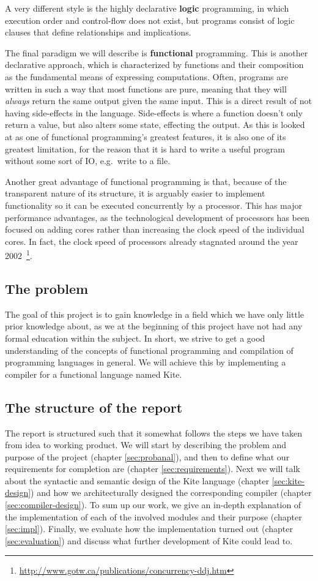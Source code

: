 A very different style is the highly declarative \textbf{logic} programming, in which execution order and control-flow does not exist, but programs consist of logic clauses that define relationships and implications.

The final paradigm we will describe is \textbf{functional} programming. This is another declarative approach, which is characterized by functions and their composition as the fundamental means of expressing computations. Often, programs are written in such a way that most functions are pure, meaning that they will \emph{always} return the same output given the same input. This is a direct result of not having side-effects in the language. Side-effects is where a function doesn't only return a value, but also alters some state, effecting the output. As this is looked at as one of functional programming's greatest features, it is also one of its greatest limitation, for the reason that it is hard to write a useful program without some sort of IO, e.g.\ write to a file.

Another great advantage of functional programming is that, because of the transparent nature of its structure, it is arguably easier to implement functionality so it can be executed concurrently by a processor. This has major performance advantages, as the technological development of processors has been focused on adding cores rather than increasing the clock speed of the individual cores. In fact, the clock speed of processors already stagnated around the year 2002~\footnote{\url{http://www.gotw.ca/publications/concurrency-ddj.htm}}.


\subsection{The problem}
The goal of this project is to gain knowledge in a field which we have only little prior knowledge about, as we at the beginning of this project have not had any formal education within the subject. In short, we strive to get a good understanding of the concepts of functional programming and compilation of programming languages in general. We will achieve this by implementing a compiler for a functional language named Kite.


\subsection{The structure of the report}
The report is structured such that it somewhat follows the steps we have taken from idea to working product. We will start by describing the problem and purpose of the project (chapter \ref{sec:probanal}), and then to define what our requirements for completion are (chapter \ref{sec:requirements}). Next we will talk about the syntactic and semantic design of the Kite language (chapter \ref{sec:kite-design}) and how we architecturally designed the corresponding compiler (chapter \ref{sec:compiler-design}). To sum up our work, we give an in-depth explanation of the implementation of each of the involved modules and their purpose (chapter \ref{sec:impl}). Finally, we evaluate how the implementation turned out (chapter \ref{sec:evaluation}) and discuss what further development of Kite could lead to.

